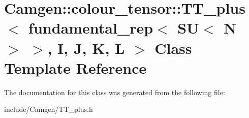 \hypertarget{a00540}{\section{Camgen\-:\-:colour\-\_\-tensor\-:\-:T\-T\-\_\-plus$<$ fundamental\-\_\-rep$<$ S\-U$<$ N $>$ $>$, I, J, K, L $>$ Class Template Reference}
\label{a00540}
}


The documentation for this class was generated from the following file\-:\begin{DoxyCompactItemize}
\item 
include/\-Camgen/T\-T\-\_\-plus.\-h\end{DoxyCompactItemize}
